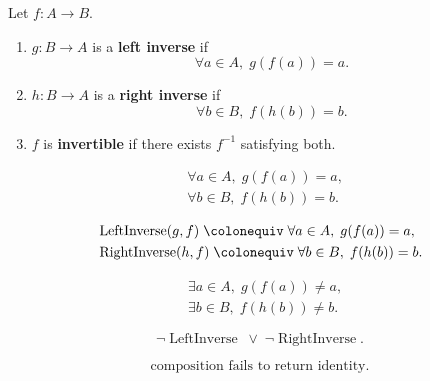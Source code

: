 \begin{tcolorbox}[title={Definition --- Left/Right Inverse}]
\begin{definition}
\label{def:alg-inverse}
Let $f : A \to B$.
\begin{enumerate}[label=(\roman*)]
  \item $g : B \to A$ is a \textbf{left inverse} if
        \[
        \forall a \in A,\; g(f(a)) = a.
        \]
  \item $h : B \to A$ is a \textbf{right inverse} if
        \[
        \forall b \in B,\; f(h(b)) = b.
        \]
  \item $f$ is \textbf{invertible} if there exists $f^{-1}$ satisfying both.
\end{enumerate}
\end{definition}
\end{tcolorbox}

\begin{remark*}
\[
\begin{aligned}
&\forall a \in A,\; g(f(a))=a, \\
&\forall b \in B,\; f(h(b))=b.
\end{aligned}
\]
\end{remark*}

\begin{remark*}
\[
\begin{aligned}
&\operatorname{LeftInverse}(g,f)
\;\colonequiv\;
\forall a \in A,\; g(f(a))=a, \\
&\operatorname{RightInverse}(h,f)
\;\colonequiv\;
\forall b \in B,\; f(h(b))=b.
\end{aligned}
\]
\end{remark*}

\begin{remark*}
\[
\begin{aligned}
&\exists a \in A,\; g(f(a)) \ne a, \\
&\exists b \in B,\; f(h(b)) \ne b.
\end{aligned}
\]
\end{remark*}

\begin{remark*}
\[
\neg \operatorname{LeftInverse}
\;\lor\;
\neg \operatorname{RightInverse}.
\]
\end{remark*}

\begin{remark*}
\[
\text{composition fails to return identity}.
\]
\end{remark*}

